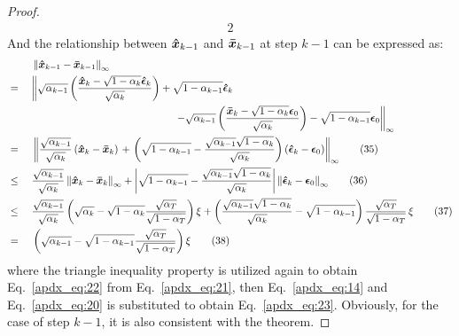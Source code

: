 \documentclass{article}
\newtheorem{proof}{Proof}
\begin{document}
\begin{proof}
\begin{alignat}{2}
\end{alignat}
And the relationship between $\boldsymbol{\Hat{x}}_{k-1}$ and $\boldsymbol{\Bar{x}}_{k-1}$ at step $k-1$ can be expressed as:
\begin{alignat}{2}
& \; && \left\|\boldsymbol{\Hat{x}}_{k-1} - \boldsymbol{\Bar{x}}_{k-1}\right\|_\infty \notag \\ & = \; && {\left\|\sqrt{\alpha_{k-1}}\left(\frac{\boldsymbol{\Hat{x}}_{k}-\sqrt{1-\alpha_{k}}\boldsymbol{\Hat{\epsilon}}_{k}}{\sqrt{\alpha_{k}}}\right)  + \sqrt{1-\alpha_{k-1}}\boldsymbol{\Hat{\epsilon}}_{k} \right.}  \notag \\ & \; &&  \quad \quad \quad \quad  \quad \quad \quad  \quad \quad \quad  \quad \quad \quad  \quad{\left. - \sqrt{\alpha_{k-1}}\left(\frac{\boldsymbol{\Bar{x}}_{k}-\sqrt{1-\alpha_{k}}\boldsymbol{{\epsilon}}_{0}}{\sqrt{\alpha_{k}}}\right) - \sqrt{1-\alpha_{k-1}}\boldsymbol{{\epsilon}}_0  \right\|_\infty} \notag \\
& = \; &&\left\| \frac{\sqrt{\alpha_{k-1}}}{\sqrt{\alpha_{k}}} \left( \boldsymbol{\Hat{x}}_{k} - \boldsymbol{\Bar{x}}_{k} \right) \right. \notag  + {\left. \left(\sqrt{1-\alpha_{k-1}} - \frac{\sqrt{\alpha_{k-1}}\sqrt{1-\alpha_{k}}}{\sqrt{\alpha_{k}}}\right) \left(\boldsymbol{\Hat{\epsilon}}_{k} - \boldsymbol{{\epsilon}}_0\right) \right\|_\infty} \tag{35} \label{apdx_eq:21} \\
& \leq \; && \frac{\sqrt{\alpha_{k-1}}}{\sqrt{\alpha_{k}}} \left\| \boldsymbol{\Hat{x}}_{k} - \boldsymbol{\Bar{x}}_{k} \right\|_\infty \notag  + {\left|\sqrt{1-\alpha_{k-1}} - \frac{\sqrt{\alpha_{k-1}}\sqrt{1-\alpha_{k}}}{\sqrt{\alpha_{k}}}\right| \left\| \boldsymbol{\Hat{\epsilon}}_{k} - \boldsymbol{{\epsilon}}_0 \right\|_\infty} \tag{36} \label{apdx_eq:22} \\
& \leq \; && \frac{\sqrt{\alpha_{k-1}}}{\sqrt{\alpha_{k}}} \left(\sqrt{\alpha_{k}} - \sqrt{1-\alpha_{k}}\frac{\sqrt{\alpha_{T}}}{\sqrt{1-\alpha_{T}}}\right)\xi \notag  +  {\left(\frac{\sqrt{\alpha_{k-1}}\sqrt{1-\alpha_{k}}}{\sqrt{\alpha_{k}}} - \sqrt{1-\alpha_{k-1}}\right)\frac{\sqrt{\alpha_{T}}}{\sqrt{1-\alpha_{T}}} \, \xi } \tag{37} \label{apdx_eq:23} \\
& = \; && \left(\sqrt{\alpha_{k-1}} - \sqrt{1-\alpha_{k-1}}\frac{\sqrt{\alpha_{T}}}{\sqrt{1-\alpha_{T}}} \right) \xi \tag{38} \label{apdx_eq:24}
\end{alignat}
where the triangle inequality property is utilized again to obtain Eq.~\eqref{apdx_eq:22} from Eq.~\eqref{apdx_eq:21}, then Eq.~\eqref{apdx_eq:14} and Eq.~\eqref{apdx_eq:20} is substituted to obtain Eq.~\eqref{apdx_eq:23}. Obviously, for the case of step $k-1$, it is also consistent with the theorem.


\end{proof}
\end{document}
